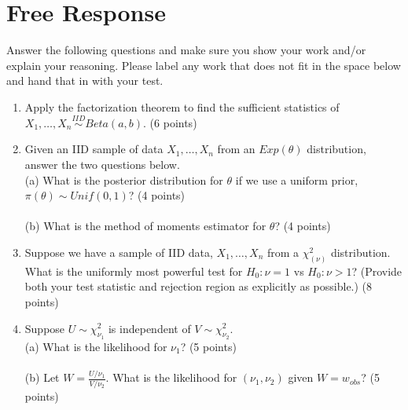 \documentclass[12pt]{article}
\begin{document}
\section{Free Response}
Answer the following questions and make sure you show your work and/or explain your reasoning. Please label any work that does not fit in the space below and hand that in with your test. 
\begin{enumerate}[leftmargin=\labelsep]
\item Apply the factorization theorem to find the sufficient statistics of $X_1, \dots, X_n \stackrel{IID}{\sim} Beta(a, b)$. (6 points)
\pagebreak 

\item Given an IID sample of data $X_1, \dots, X_n$ from an $Exp(\theta)$ distribution, answer the two questions below.\\

(a) What is the posterior distribution for $\theta$ if we use a uniform prior, $\pi(\theta) \sim Unif(0,1)$? (4 points)\\
\vspace{5in}\\
(b) What is the method of moments estimator for $\theta$? (4 points)\\
\pagebreak 



\item Suppose we have a sample of IID data, $X_1, \dots, X_n$ from a $\chi^2_{(\nu)}$ distribution. What is the uniformly most powerful test for $H_0: \nu = 1$ vs $H_0: \nu >1$? (Provide both your test statistic and rejection region as explicitly as possible.) (8 points)\\
\pagebreak 

\item Suppose $U \sim \chi^2_{\nu_1}$ is independent of $V \sim \chi^2_{\nu_2}$.\\

(a) What is the likelihood for $\nu_1$? (5 points)\\
\vspace{3in}\\
(b) Let $W = \frac{U/\nu_1}{V/\nu_2}$. What is the likelihood for $(\nu_1, \nu_2)$ given  $W = w_{obs}$? (5 points)\\
\pagebreak 


\end{enumerate}
\end{document}
